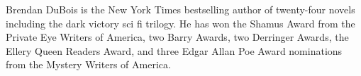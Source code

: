 Brendan DuBois is the New York Times bestselling author of twenty-four novels including the dark victory sci fi trilogy. He has won the Shamus Award from the Private Eye Writers of America, two Barry Awards, two Derringer Awards, the Ellery Queen Readers Award, and three Edgar Allan Poe Award nominations from the Mystery Writers of America.